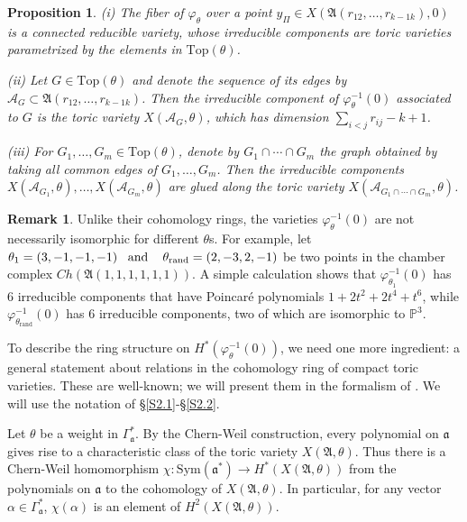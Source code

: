 \documentclass[11pt]{article}
\newtheorem{prop}[theo]{Proposition}
\theoremstyle{definition}
\newtheorem{rema}[theo]{Remark}
\numberwithin{equation}{section}
\newcommand{\A}{\mathfrak{A}}
\begin{document}
\begin{prop}\label{toricfib}
	(i) The fiber of $\varphi_\theta$ over a point $y_\Pi\in 
	X(\A(r_{12}, \ldots ,r_{k-1 k}),0)$ is a connected reducible variety, 
	whose irreducible components are toric varieties parametrized by the 
	elements in $\mathrm{Top}(\theta)$. 
	
	(ii) Let $G\in\mathrm{Top}(\theta)$ and denote the sequence of its edges 
	by $\mathcal{A}_G\subset \A(r_{12}, \ldots ,r_{k-1 k})$. Then the irreducible 
	component of $\varphi_\theta^{-1}(0)$ associated to $G$ is the toric 
	variety  $X(\mathcal{A}_G,\theta)$, which has  dimension 
	$\sum_{i<j}r_{ij}-k+1$. 
	
	(iii) For $G_1, \ldots ,G_m\in\mathrm{Top}(\theta)$,  denote by $G_1\cap \cdots \cap 
	G_m$ the graph obtained by taking all common edges of $G_1, \ldots ,G_m$. Then 
	the  
	irreducible components  
	$X(\mathcal{A}_{G_1},\theta), \ldots ,X(\mathcal{A}_{G_m},\theta)$ are glued 
	along the toric variety $X(\mathcal{A}_{G_1\cap \cdots \cap G_m},\theta)$.
\end{prop}


\begin{rema}
	Unlike their cohomology rings, the varieties $\varphi_\theta^{-1}(0)$ are 
	not necessarily isomorphic for different $\theta$s. For example, let 
	$\theta_1 = (3,-1,-1,-1) \text{\,\,\, and \,\,\, } \theta_\mathrm{rand} = 
	(2,-3,2,-1)$ be two points in  the chamber complex $Ch(\A(1,1,1,1,1,1))$. A 
	simple calculation shows that $\varphi_{\theta_1}^{-1}(0)$ has 6 
	irreducible components that have Poincar\'e polynomials $1+2t^2+2t^4+t^6$, 
	while $\varphi_{\theta_\mathrm{rand}}^{-1}(0)$ has 6 irreducible 
	components, two of which are isomorphic to $\mathbb{P}^3$.
\end{rema}


To describe the ring structure on $H^*(\varphi_\theta^{-1}(0))$, we need one 
more ingredient: a general statement about relations in the cohomology 
ring of compact toric varieties. These are well-known; we will present them in 
the formalism of \cite{SzV}. We will use the notation of 
\S\ref{S2.1}-\S\ref{S2.2}.

Let $\theta$ be a weight in $\Gamma_{\mathfrak{a}}^*$. By the Chern-Weil 
construction, every polynomial on $\mathfrak{a}$ gives rise to a characteristic 
class of the toric variety $X(\A,\theta)$. Thus there is  a Chern-Weil 
homomorphism 
$\chi: \mathrm{Sym}(\mathfrak{a}^*)\to H^*(X(\A,\theta))$ from the polynomials 
on $\mathfrak{a}$ to the cohomology of $X(\A,\theta)$. In particular, for any 
vector $\alpha\in\Gamma_{\mathfrak{a}}^*$, $\chi(\alpha)$ is an element of 
$H^2(X(\A,\theta))$.
\end{document}
